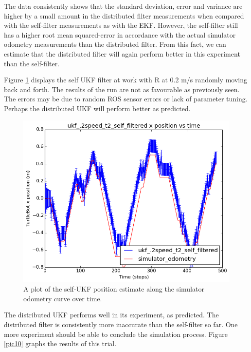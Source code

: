 \documentclass[conference]{IEEEtran} \usepackage[T1]{fontenc} \usepackage[backend=biber, style=ieee]{biblatex}
\begin{document}

The data consistently shows that the standard deviation, error and variance are higher by a small amount in 
the distributed filter measurements when compared with the self-filter measurements as with the EKF. However, 
the self-filter still has a higher root mean squared-error in accordance with the actual simulator odometry 
measurements than the distributed filter. From this fact, we can estimate that the distributed filter will 
again perform better in this experiment than the self-filter.

Figure \ref{pic9} displays the self UKF filter at work with R at 0.2 m/s randomly moving back 
and forth. The results of the run are not as favourable as previously seen. The 
errors may be due to random ROS sensor errors or lack of parameter tuning. Perhaps 
the distributed UKF will perform better as predicted.

\begin{figure}
\centering 
\includegraphics[scale=.45]{ukf_2speed_t2_self_filtered_pos_err_graph}
\caption {A plot of the self-UKF position estimate along the simulator odometry curve over time.}
\label{pic9} 
\end{figure}

The distributed UKF performs well in its experiment, as predicted. The distributed filter is consistently 
more inaccurate than the self-filter so far. One more experiment should be able to conclude the simulation process. 
Figure \ref{pic10} graphs the results of this trial. 
\end{document}
